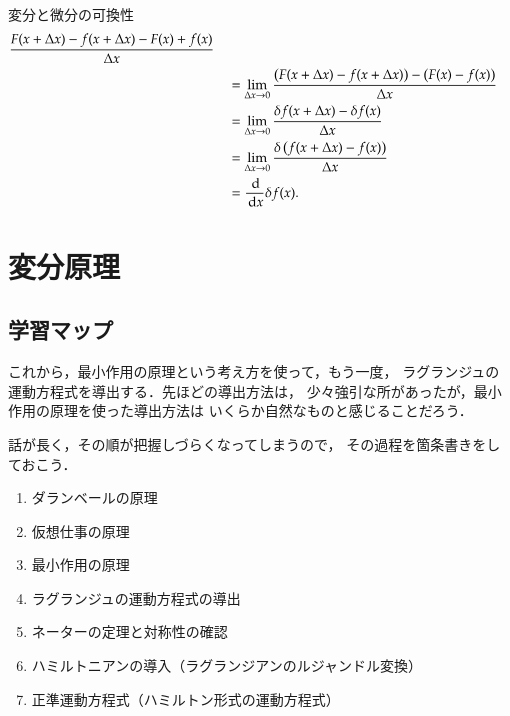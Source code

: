 \begin{memo}{変分と微分の可換性}
\begin{align*}
                                      \frac{F(x+\Delta x) - f(x+\Delta x) - F(x) +  f(x) }{\Delta x} \\
                            & \quad = \lim_{\Delta x \to 0}
                                      \frac{ \left( F(x+\Delta x) - f(x+\Delta x) \right)- \left( F(x) -  f(x) \right)}{\Delta x} \\
                            & \quad = \lim_{\Delta x \to 0}
                                      \frac{ \delta f(x+\Delta x) - \delta f(x)}{\Delta x} \\
                            & \quad = \lim_{\Delta x \to 0}
                                      \frac{ \delta \left( f(x+\Delta x) - f(x) \right)}{\Delta x} \\
                            & \quad = \frac{\,\mathrm{d}}{\,\mathrm{d} x}\delta f(x).
                \end{align*}

        \end{memo}

    \section{変分原理}
        \subsection{学習マップ}
            これから，最小作用の原理という考え方を使って，もう一度，
            ラグランジュの運動方程式を導出する．先ほどの導出方法は，
            少々強引な所があったが，最小作用の原理を使った導出方法は
            いくらか自然なものと感じることだろう．

            話が長く，その順が把握しづらくなってしまうので，
            その過程を箇条書きをしておこう．
                \begin{enumerate}
                    \item ダランベールの原理
                    \item 仮想仕事の原理
                    \item 最小作用の原理
                    \item ラグランジュの運動方程式の導出
                    \item ネーターの定理と対称性の確認
                    \item ハミルトニアンの導入（ラグランジアンのルジャンドル変換）
                    \item 正準運動方程式（ハミルトン形式の運動方程式）
                \end{enumerate}


